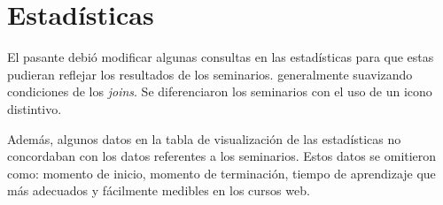 	\section{Estadísticas} %
	\label{sec:estadísticas}
	
	El pasante debió modificar algunas consultas en las estadísticas para que estas pudieran reflejar los resultados de los seminarios. generalmente suavizando condiciones de los \emph{joins}. Se diferenciaron los seminarios con el uso de un icono distintivo.

	Además, algunos datos en la tabla de visualización de las estadísticas no concordaban con los datos referentes a los seminarios. Estos datos se omitieron como: momento de inicio, momento de terminación, tiempo de aprendizaje que más adecuados y fácilmente medibles en los cursos web.

